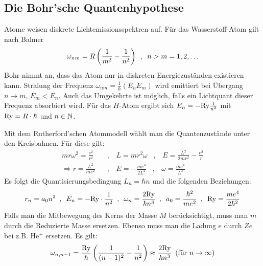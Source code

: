 \subsection{Die Bohr'sche Quantenhypothese}
Atome weisen diskrete Lichtemissionsspektren auf. Für das Wasserstoff-Atom
gilt nach Balmer
\begin{align*}
    \omega_{nm} = R \left( \frac{1}{m^2} - \frac{1}{n^2} \right)
    \hspace{5pt} , \hspace{5pt} n>m = 1,2,\dots 
\end{align*}
Bohr nimmt an, dass das Atom nur in diskreten Energiezuständen existieren
kann. Stralung der Frequenz $\omega_{nm} = \frac{1}{\hbar} (E_n E_m)$ wird
emittiert bei Übergang $n \rightarrow m$, $E_m < E_n$. Auch das Umgekehrte ist
möglich, falls ein Lichtquant dieser Frequenz absorbiert wird. Für das
$H$-Atom ergibt sich $E_n = - \text{Ry} \frac{1}{n^2}$ mit $\text{Ry} = R \cdot \hbar$
und $n \in \mathbb{N}$.

Mit dem Rutherford'schen Atommodell wählt man die Quantenzustände unter den
Kreisbahnen. Für diese gilt:
\begin{align*}
    m r \omega^2 = \frac{e^2}{r^2}
    \hspace{10pt} &, \hspace{10pt}
    L = m r^2 \omega
    \hspace{10pt} , \hspace{10pt}
    E = \frac{L^2}{2 m r^2} - \frac{e^2}{r}
    \\
    \Rightarrow
    r = \frac{L^2}{m e^2}
    \hspace{10pt} &, \hspace{10pt}
    E = - \frac{m e^4}{2 L^2}
    \hspace{10pt} , \hspace{10pt}
    \omega = \frac{m e^4}{L^3}
\end{align*}
Es folgt die Quantisierungsbedingung $L_n = \hbar n$ und die folgenden Beziehungen:
\begin{align*}
    r_n = a_0 n^2
    \hspace{5pt} , \hspace{5pt}
    E_n = - \text{Ry} \cdot \frac{1}{n^2}
    \hspace{5pt} , \hspace{5pt}
    \omega_n = \frac{2 \text{Ry}}{\hbar n^3}
    \hspace{5pt} , \hspace{5pt}
    a_0 = \frac{\hbar^2}{m e^2}
    \hspace{5pt} , \hspace{5pt}
    \text{Ry} = \frac{m e^4}{2 \hbar^2}
\end{align*}
Falls man die Mitbewegung des Kerns der Masse $M$ berücksichtigt, muss man
$m$ durch die Reduzierte Masse ersetzen. Ebenso muss man die Ladung $e$ durch
$Ze$ bei z.B. He$^+$ ersetzen. Es gilt:
\begin{align*}
    \omega_{n,n-1} = \frac{\text{Ry}}{\hbar} \left( \frac{1}{(n-1)^2} - \frac{1}{n^2} \right)
    \approx \frac{2 \text{Ry}}{\hbar n^3}
    \hspace{5pt} (\text{für } n \rightarrow \infty)
\end{align*}

